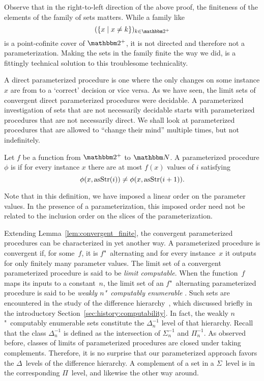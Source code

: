 Observe that in the right-to-left direction of the above proof, the finiteness of the elements of the family of sets matters.
While a family like
\begin{equation*}
  (\{x \st x \neq k\})_{k \in \binary^+}
\end{equation*}
is a point-cofinite cover of $\binary^+$, it is not directed and therefore not a parameterization.
Making the sets in the family finite the way we did, is a fittingly technical solution to this troublesome technicality.

A direct parameterized procedure is one where the only changes on some instance $x$ are from  to a `correct' decision or vice versa.
As we have seen, the limit sets of convergent direct parameterized procedures were decidable.
A parameterized investigation of sets that are not necessarily decidable starts with parameterized procedures that are not necessarily direct.
We shall look at parameterized procedures that are allowed to \enquote{change their mind} multiple times, but not indefinitely.
\begin{definition}
  Let $f$ be a function from $\binary^+$ to $\bbN$.
  A parameterized procedure $\phi$ is  if for every instance $x$ there are at most $f(x)$ values of $i$ satisfying
  \begin{equation*}
    \phi(x, \operatorname{asStr}(i)) \neq \phi(x, \operatorname{asStr}(i + 1)).
  \end{equation*}
\end{definition}

Note that in this definition, we have imposed a linear order on the parameter values.
In the presence of a parameterization, this imposed order need not be related to the inclusion order on the slices of the parameterization.

Extending Lemma~\ref{lem:convergent_finite}, the convergent parameterized procedures can be characterized in yet another way.
A parameterized procedure is convergent if, for some~$f$, it is $f$"~alternating and for every instance~$x$ it outputs  for only finitely many parameter values.
The limit set of a convergent parameterized procedure is said to be \emph{limit computable}.
When the function~$f$ maps its inputs to a constant~$n$, the limit set of an $f$"~alternating parameterized procedure is said to be \emph{weakly $n$"~computably enumerable} \parencite{odifreddi1992classical,epstein1981hierarchies}.
Such sets are encountered in the study of the difference hierarchy~\parencite{downey2010algorithmic}, which discussed briefly in the introductory Section~\ref{sec:history:computability}.
In fact, the weakly $n$"~computably enumerable sets constitute the $\Delta^{-1}_n$ level of that hierarchy.
Recall that the class $\Delta^{-1}_n$ is defined as the intersection of $\Sigma^{-1}_n$ and $\Pi^{-1}_n$.
As observed before, classes of limits of parameterized procedures are closed under taking complements.
Therefore, it is no surprise that our parameterized approach favors the $\Delta$~levels of the difference hierarchy.
A complement of a set in a $\Sigma$~level is in the corresponding $\Pi$~level, and likewise the other way around.

